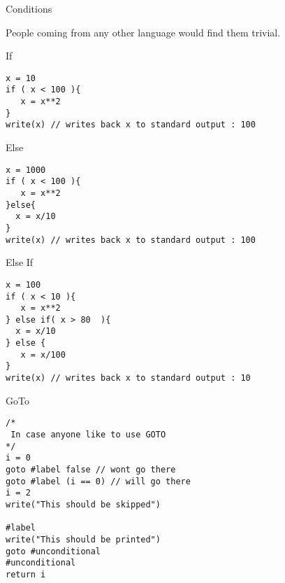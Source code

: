 \begin{section}{Conditions}

People coming from any other language would find them trivial.

\begin{subsection}{If}

\begin{lstlisting}[style=JexlStyle]
x = 10 
if ( x < 100 ){
   x = x**2
}
write(x) // writes back x to standard output : 100
\end{lstlisting}
\end{subsection}

\begin{subsection}{Else}

\begin{lstlisting}[style=JexlStyle]
x = 1000 
if ( x < 100 ){
   x = x**2
}else{
  x = x/10 
}
write(x) // writes back x to standard output : 100
\end{lstlisting}
\end{subsection}

\begin{subsection}{Else If}

\begin{center}
\begin{minipage}{\linewidth}
\begin{lstlisting}[style=JexlStyle]
x = 100 
if ( x < 10 ){
   x = x**2
} else if( x > 80  ){
  x = x/10 
} else {
   x = x/100 
}
write(x) // writes back x to standard output : 10
\end{lstlisting}
\end{minipage}
\end{center}

\end{subsection}

\begin{subsection}{GoTo}

\begin{lstlisting}[style=JexlStyle]
/* 
 In case anyone like to use GOTO
*/
i = 0 
goto #label false // wont go there 
goto #label (i == 0) // will go there 
i = 2 
write("This should be skipped")

#label
write("This should be printed")
goto #unconditional
#unconditional
return i 
\end{lstlisting}
\end{subsection}
\end{section}

